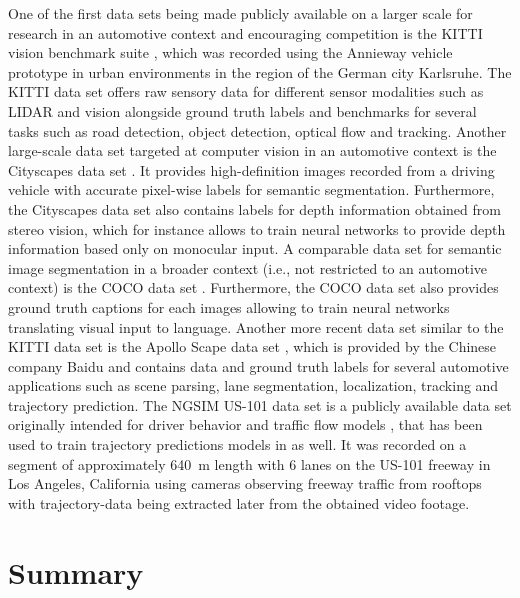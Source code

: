 One of the first data sets being made publicly available on a larger scale for research in an automotive context and encouraging competition is the KITTI vision benchmark suite \parencite{Geiger2013a}, which was recorded using the Annieway vehicle prototype  in urban environments in the region of the German city Karlsruhe.
The KITTI data set offers raw sensory data for different sensor modalities such as \ac{LIDAR} and vision alongside ground truth labels and benchmarks for several tasks such as road detection, object detection, optical flow and tracking.
Another large-scale data set targeted at computer vision in an automotive context is the Cityscapes data set \parencite{Cordts2016}. 
It provides high-definition images recorded from a driving vehicle with accurate pixel-wise labels for semantic segmentation.
Furthermore, the Cityscapes data set also contains labels for depth information obtained from stereo vision, which for instance allows to train neural networks to provide depth information based only on monocular input. 
A comparable data set for semantic image segmentation in a broader context (i.e., not restricted to an automotive context) is the 
\ac{COCO}  data set \parencite{Lin2014}.
Furthermore, the \ac{COCO} data set also provides ground truth captions for each images allowing to train neural networks translating visual input to language. 
Another more recent data set similar to the KITTI data set is the Apollo Scape data set \parencite{Huang2018}, which is provided by the Chinese company Baidu and contains data and ground truth labels for several automotive applications such as scene parsing, lane segmentation, localization, tracking and trajectory prediction.
The \ac{NGSIM} US-101 data set \parencite{NGSIM-US101} is a publicly available data set originally intended for driver behavior and traffic flow models \parencite{He2017}, that has been used to train trajectory predictions models in \textcite{Altche2018, Deo2018} as well.
It was recorded on a segment of approximately \SI{640}{\meter} length with \num{6} lanes on the US-101 freeway in Los Angeles, California  using cameras observing freeway traffic from rooftops with trajectory-data being extracted later from the obtained video footage.

\section{Summary}
\label{sec:related_work_summary}

